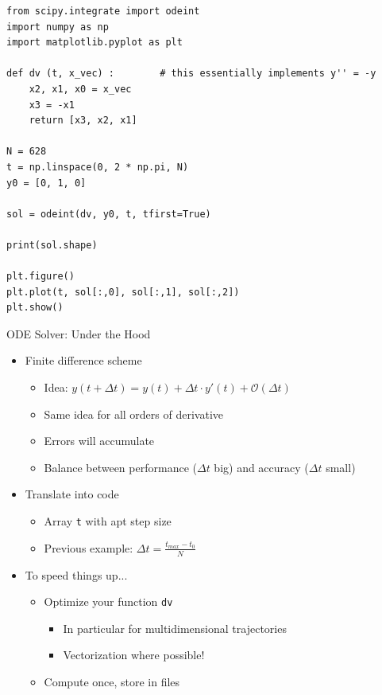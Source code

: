 
\begin{frame}[fragile]
%
\begin{codebox}
\begin{verbatim}
from scipy.integrate import odeint
import numpy as np
import matplotlib.pyplot as plt

def dv (t, x_vec) :        # this essentially implements y'' = -y
    x2, x1, x0 = x_vec
    x3 = -x1
    return [x3, x2, x1]

N = 628
t = np.linspace(0, 2 * np.pi, N)
y0 = [0, 1, 0]

sol = odeint(dv, y0, t, tfirst=True)

print(sol.shape)

plt.figure()
plt.plot(t, sol[:,0], sol[:,1], sol[:,2])
plt.show()
\end{verbatim}
\end{codebox}
%
\end{frame}


\begin{frame}{ODE Solver: Under the Hood}
%
\begin{itemize}
\item Finite difference scheme
	\begin{itemize}
	\item Idea: $y(t + \Delta t) = y(t) + \Delta t \cdot y'(t) + \mathcal{O}(\Delta t)$
	\item Same idea for all orders of derivative
	\item Errors will accumulate
	\item Balance between performance ($\Delta t$ big) and accuracy ($\Delta t$ small)
	\end{itemize}
\item Translate into code
	\begin{itemize}
	\item Array \texttt{t} with apt step size
	\item Previous example: $\Delta t = \frac{t_{max} - t_0}{N}$
	\end{itemize}
\item To speed things up...
	\begin{itemize}
	\item Optimize your function \texttt{dv}
		\begin{itemize}
		\item In particular for multidimensional trajectories 
		\item Vectorization where possible!
		\end{itemize}
	\item Compute once, store in files
	\end{itemize}
\end{itemize}
%
\end{frame}

